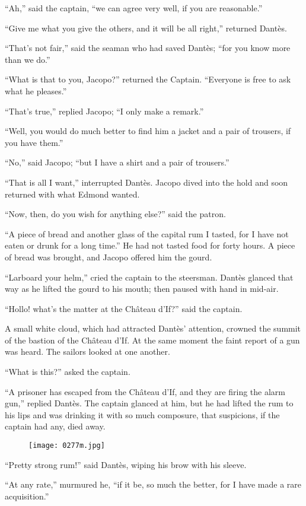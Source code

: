 “Ah,” said the captain, “we can agree very well, if you are
reasonable.”

“Give me what you give the others, and it will be all right,” returned
Dantès.

“That’s not fair,” said the seaman who had saved Dantès; “for you know
more than we do.”

“What is that to you, Jacopo?” returned the Captain. “Everyone is free
to ask what he pleases.”

“That’s true,” replied Jacopo; “I only make a remark.”

“Well, you would do much better to find him a jacket and a pair of
trousers, if you have them.”

“No,” said Jacopo; “but I have a shirt and a pair of trousers.”

“That is all I want,” interrupted Dantès. Jacopo dived into the hold
and soon returned with what Edmond wanted.

“Now, then, do you wish for anything else?” said the patron.

“A piece of bread and another glass of the capital rum I tasted, for I
have not eaten or drunk for a long time.” He had not tasted food for
forty hours. A piece of bread was brought, and Jacopo offered him the
gourd.

“Larboard your helm,” cried the captain to the steersman. Dantès
glanced that way as he lifted the gourd to his mouth; then paused with
hand in mid-air.

“Hollo! what’s the matter at the Château d’If?” said the captain.

A small white cloud, which had attracted Dantès’ attention, crowned the
summit of the bastion of the Château d’If. At the same moment the faint
report of a gun was heard. The sailors looked at one another.

“What is this?” asked the captain.

“A prisoner has escaped from the Château d’If, and they are firing the
alarm gun,” replied Dantès. The captain glanced at him, but he had
lifted the rum to his lips and was drinking it with so much composure,
that suspicions, if the captain had any, died away.

\begin{figure}[ht]
\texttt{[image: 0277m.jpg]}
\end{figure}

“Pretty strong rum!” said Dantès, wiping his brow with his sleeve.

“At any rate,” murmured he, “if it be, so much the better, for I have
made a rare acquisition.”

